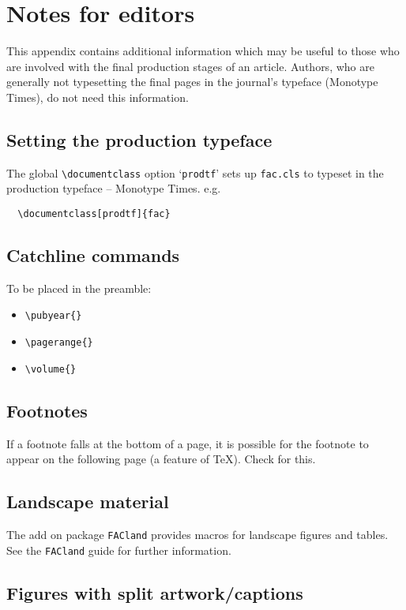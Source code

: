 \documentclass{fac}
\begin{document}
\ifprodtf
\section{Notes for editors}

This appendix contains additional information which may be useful to
those who are involved with the final production stages of an article.
Authors, who are generally not typesetting the final pages in the
journal's typeface (Monotype Times), do not need this information.

\subsection{Setting the production typeface}

The global \verb"\documentclass" option `\verb"prodtf"' sets up
\verb"fac.cls" to typeset in the production typeface -- Monotype Times.
e.g.
%
\begin{verbatim}
  \documentclass[prodtf]{fac}
\end{verbatim}

\subsection{Catchline commands}

To be placed in the preamble:
\begin{itemize}
\item \verb"\pubyear{}"
\item \verb"\pagerange{}"
\item \verb"\volume{}"
\end{itemize}

\subsection{Footnotes}

If a footnote falls at the bottom of a page, it is possible for the
footnote to appear on the following page (a feature of \TeX ). Check
for this.

\subsection{Landscape material}

The add on package \verb"FACland" provides macros for landscape figures and
tables. See the \verb"FACland" guide for further information.

\subsection{Figures with split artwork/captions}
\end{document}
